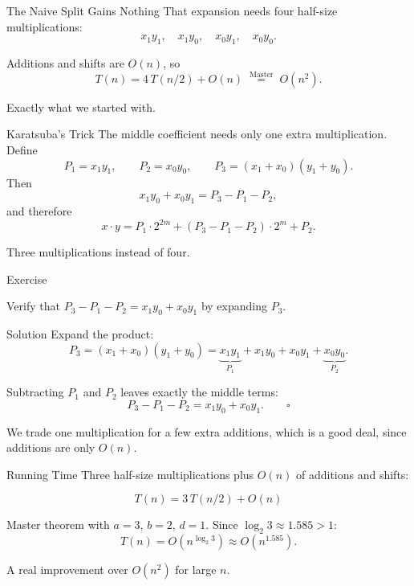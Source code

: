 \documentclass[10pt,aspectratio=169]{beamer}
\begin{document}
\begin{frame}{The Naive Split Gains Nothing}
  That expansion needs \alert{four} half-size multiplications:
  \[
    x_1 y_1, \quad x_1 y_0, \quad x_0 y_1, \quad x_0 y_0.
  \]

  \bigskip
  Additions and shifts are $O(n)$, so
  \[
    T(n) = 4\,T(n/2) + O(n)
    \;\overset{\text{Master}}{=}\; O(n^2).
  \]

  \bigskip
  \begin{center}
    Exactly what we started with.
  \end{center}
\end{frame}

\begin{frame}{Karatsuba's Trick}
  The middle coefficient needs only \alert{one} extra multiplication. Define
  \[
    P_1 = x_1 y_1, \qquad P_2 = x_0 y_0, \qquad P_3 = (x_1 + x_0)(y_1 + y_0).
  \]
  \pause
  \bigskip
  Then
  \[
    x_1 y_0 + x_0 y_1 = P_3 - P_1 - P_2,
  \]
  and therefore
  \[
    x \cdot y = P_1 \cdot 2^{2m} + (P_3 - P_1 - P_2)\cdot 2^m + P_2.
  \]

  \bigskip
  \begin{center}
    \alert{Three} multiplications instead of four.
  \end{center}
\end{frame}

\begin{frame}{Exercise}
  \begin{center}
    Verify that $P_3 - P_1 - P_2 = x_1 y_0 + x_0 y_1$ by expanding $P_3$.
  \end{center}
\end{frame}

\begin{frame}{Solution}
  Expand the product:
  \[
    P_3 = (x_1 + x_0)(y_1 + y_0)
        = \underbrace{x_1 y_1}_{P_1} + x_1 y_0 + x_0 y_1 + \underbrace{x_0 y_0}_{P_2}.
  \]

  \bigskip
  Subtracting $P_1$ and $P_2$ leaves exactly the middle terms:
  \[
    P_3 - P_1 - P_2 = x_1 y_0 + x_0 y_1. \qquad \square
  \]

  \bigskip
  \begin{center}
    \small We trade one multiplication for a few extra additions, which is a good deal,
    since additions are only $O(n)$.
  \end{center}
\end{frame}

\begin{frame}{Running Time}
  Three half-size multiplications plus $O(n)$ of additions and shifts:

  \begin{alertblock}{}
    \[
      T(n) = 3\,T(n/2) + O(n)
    \]
  \end{alertblock}

  \bigskip
  Master theorem with $a = 3$, $b = 2$, $d = 1$. Since $\log_2 3 \approx 1.585 > 1$:
  \[
    T(n) = O(n^{\log_2 3}) \approx O(n^{1.585}).
  \]

  \bigskip
  \begin{center}
    A real improvement over $O(n^2)$ for large $n$.
  \end{center}
\end{frame}
\end{document}
